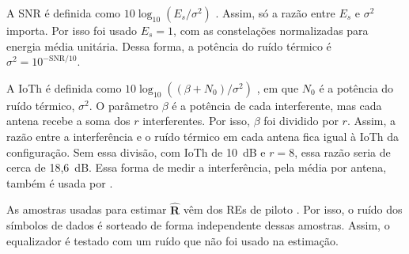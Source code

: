 
A SNR é definida como $10\log_{10}(E_s/\sigma^2)$ \cite{zhao2025jsac}. Assim, só a razão entre $E_s$ e $\sigma^2$ importa. Por isso foi usado $E_s = 1$, com as constelações normalizadas para energia média unitária. Dessa forma, a potência do ruído térmico é $\sigma^2 = 10^{-\mathrm{SNR}/10}$.

A IoTh é definida como $10\log_{10}((\beta + N_0)/\sigma^2)$ \cite{zhao2025jsac}, em que $N_0$ é a potência do ruído térmico, $\sigma^2$. O parâmetro $\beta$ é a potência de cada interferente, mas cada antena recebe a soma dos $r$ interferentes. Por isso, $\beta$ foi dividido por $r$. Assim, a razão entre a interferência e o ruído térmico em cada antena fica igual à IoTh da configuração. Sem essa divisão, com IoTh de 10~dB e $r = 8$, essa razão seria de cerca de 18,6~dB. Essa forma de medir a interferência, pela média por antena, também é usada por .

As amostras usadas para estimar $\hat{\mathbf{R}}$ vêm dos REs de piloto \cite{zhao2025jsac}. Por isso, o ruído dos símbolos de dados é sorteado de forma independente dessas amostras. Assim, o equalizador é testado com um ruído que não foi usado na estimação.


